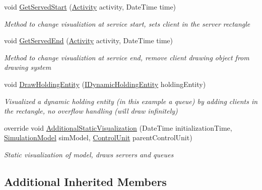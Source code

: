 \begin{DoxyCompactItemize}
void \hyperlink{class_simple_queue_example_1_1_drawing_1_1_queue_control_visualization_engine_a9954ccdbfa5ef35606d3b35cc35b3354}{Get\+Served\+Start} (\hyperlink{class_simulation_core_1_1_h_c_c_m_elements_1_1_activity}{Activity} activity, Date\+Time time)
\begin{DoxyCompactList}\small\item\em Method to change visualiztion at service start, sets client in the server rectangle \end{DoxyCompactList}\item 
void \hyperlink{class_simple_queue_example_1_1_drawing_1_1_queue_control_visualization_engine_a34db9c104835f781817545f7eb221d3b}{Get\+Served\+End} (\hyperlink{class_simulation_core_1_1_h_c_c_m_elements_1_1_activity}{Activity} activity, Date\+Time time)
\begin{DoxyCompactList}\small\item\em Method to change visualiztion at service end, remove client drawing object from drawing system \end{DoxyCompactList}\item 
void \hyperlink{class_simple_queue_example_1_1_drawing_1_1_queue_control_visualization_engine_a751e4000e62c0a8e0ca28997edcc5d09}{Draw\+Holding\+Entity} (\hyperlink{interface_simulation_core_1_1_h_c_c_m_elements_1_1_i_dynamic_holding_entity}{I\+Dynamic\+Holding\+Entity} holding\+Entity)
\begin{DoxyCompactList}\small\item\em Visualized a dynamic holding entity (in this example a queue) by adding clients in the rectangle, no overflow handling (will draw infinitely) \end{DoxyCompactList}\item 
override void \hyperlink{class_simple_queue_example_1_1_drawing_1_1_queue_control_visualization_engine_a1edb2d77618c0a44228d6f407435dd76}{Additional\+Static\+Visualization} (Date\+Time initialization\+Time, \hyperlink{class_simulation_core_1_1_simulation_classes_1_1_simulation_model}{Simulation\+Model} sim\+Model, \hyperlink{class_simulation_core_1_1_h_c_c_m_elements_1_1_control_unit}{Control\+Unit} parent\+Control\+Unit)
\begin{DoxyCompactList}\small\item\em Static visualization of model, draws servers and queues \end{DoxyCompactList}\end{DoxyCompactItemize}
\subsection*{Additional Inherited Members}


